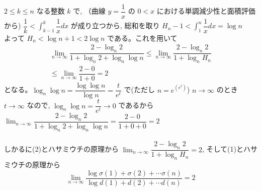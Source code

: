 \\
$2\le k\le n$ なる整数 $k$ で, （曲線 $y=\dfrac{1}{x}$ の $0<x$ における単調減少性と面積評価から) $\dfrac{1}{k}<\displaystyle\int_{k-1}^{k} \dfrac{1}{x} dx$ が成り立つから, 総和を取り $H_n-1<\displaystyle\int_1^{n}\dfrac{1}{x} dx=\log{n} $ \\
よって $H_n<\log{n}+1<2\log{n}$ である。これを用いて
\begin{eqnarray*}
\displaystyle\lim_{n\to\infty}\dfrac{2-\log_n{2}}{1+\log_n{2}+\log_n{\log{n}}}\le\displaystyle\lim_{n\to\infty}\dfrac{2-\log_n{2}}{1+\log_n{H_n}}\\
\le\displaystyle\lim_{n\to\infty}\dfrac{2-0}{1+0}=2 
\end{eqnarray*}
となる。$\log_n{\log{n}}=\dfrac{\log{\log{n}}}{\log{n}}=\dfrac{t}{e^t}$ で(ただし $n= e^{(e^t)}$) $n\rightarrow \infty$ のとき $t\rightarrow \infty$ なので, $\log_n{\log{n}}=\dfrac{t}{e^t}\rightarrow 0$ であるから $\displaystyle\lim_{n\to\infty}\dfrac{2-\log_n{2}}{1+\log_n{2}+\log_n{\log{n}}}=\dfrac{2-0}{1+0+0}=2$\\
\\
しかるに(2)とハサミウチの原理から $\displaystyle\lim_{n\to\infty}\dfrac{2-\log_n{2}}{1+\log_n{H_n}}=2$, そして(1)とハサミウチの原理から
\[\displaystyle\lim_{n\to\infty }\dfrac{\log{\sigma(1) +\sigma (2)+\cdots \sigma (n)}}{\log{d(1)+d(2)+\cdots d(n)}}=2\]
